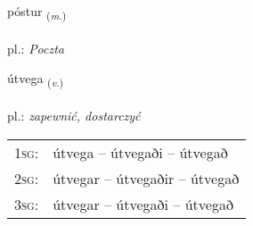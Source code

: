 \documentclass[frontgrid, backgrid]{flacards}\usepackage[]{graphicx}\usepackage[]{xcolor}
\begin{document}
\renewcommand{\flhead}{\vskip5pt \fboxsep=0pt {\small\bfseries\footnotesize Nafnorð | rzeczownik}}
\renewcommand{\fcfoot}{\vskip5pt \fboxsep=0pt \hspace{2pt}{\small\bfseries\footnotesize 3K}}

\renewcommand{\blhead}{\vskip5pt {\small\bfseries\footnotesize Nafnorð | rzeczownik }}
\renewcommand{\bcfoot}{\vskip5pt \hspace{2pt}{\small\bfseries\footnotesize 3K}}


{póstur \small{\textsubscript{(\textit{m.})}} \\[1ex] %
\textphonetic{[pʰoustʏr]} \\
pl.: \emph{Poczta} \\  [2ex]
\renewcommand*{\arraystretch}{0.8}
}

\renewcommand{\flhead}{\vskip5pt \fboxsep=0pt {\small\bfseries\footnotesize Sagnorð | czasownik}}
\renewcommand{\fcfoot}{\vskip5pt \fboxsep=0pt \hspace{2pt}{\small\bfseries\footnotesize 3K}}

\renewcommand{\blhead}{\vskip5pt {\small\bfseries\footnotesize Sagnorð | czasownik }}
\renewcommand{\bcfoot}{\vskip5pt \hspace{2pt}{\small\bfseries\footnotesize 3K}}


{útvega \small{\textsubscript{(\textit{v.})}} \\[1ex] %
\textphonetic{[uːtvɛɣa]} \\
pl.: \emph{zapewnić, dostarczyć} \\  [2ex]
\renewcommand*{\arraystretch}{0.8}
\begin{tabular}{p{1cm}l}
\textsc{1sg}: & útvega -- útvegaði -- útvegað \\ 
\textsc{2sg}: & útvegar -- útvegaðir -- útvegað \\ 
\textsc{3sg}: & útvegar -- útvegaði -- útvegað \\ 
\end{tabular}
}
\end{document}
